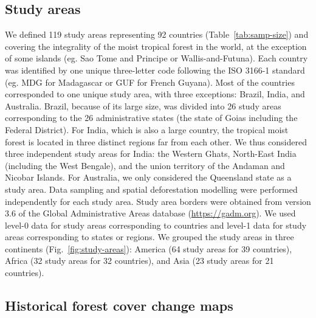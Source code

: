\documentclass[12pt,]{article}
\begin{document}
\hypertarget{study-areas}{%
\subsection{Study areas}\label{study-areas}}

We defined 119 study areas representing 92 countries (Table~\ref{tab:samp-size}) and covering the integrality of the moist tropical forest in the world, at the exception of some islands (eg. Sao Tome and Principe or Wallis-and-Futuna). Each country was identified by one unique three-letter code following the ISO 3166-1 standard (eg. MDG for Madagascar or GUF for French Guyana). Most of the countries corresponded to one unique study area, with three exceptions: Brazil, India, and Australia. Brazil, because of its large size, was divided into 26 study areas corresponding to the 26 administrative states (the state of Goias including the Federal District). For India, which is also a large country, the tropical moist forest is located in three distinct regions far from each other. We thus considered three independent study areas for India: the Western Ghats, North-East India (including the West Bengale), and the union territory of the Andaman and Nicobar Islands. For Australia, we only considered the Queensland state as a study area. Data sampling and spatial deforestation modelling were performed independently for each study area. Study area borders were obtained from version 3.6 of the Global Administrative Areas database (\url{https://gadm.org}). We used level-0 data for study areas corresponding to countries and level-1 data for study areas corresponding to states or regions. We grouped the study areas in three continents (Fig.~\ref{fig:study-areas}): America (64 study areas for 39 countries), Africa (32 study areas for 32 countries), and Asia (23 study areas for 21 countries).

\hypertarget{historical-forest-cover-change-maps}{%
\subsection{Historical forest cover change maps}\label{historical-forest-cover-change-maps}}
\end{document}
